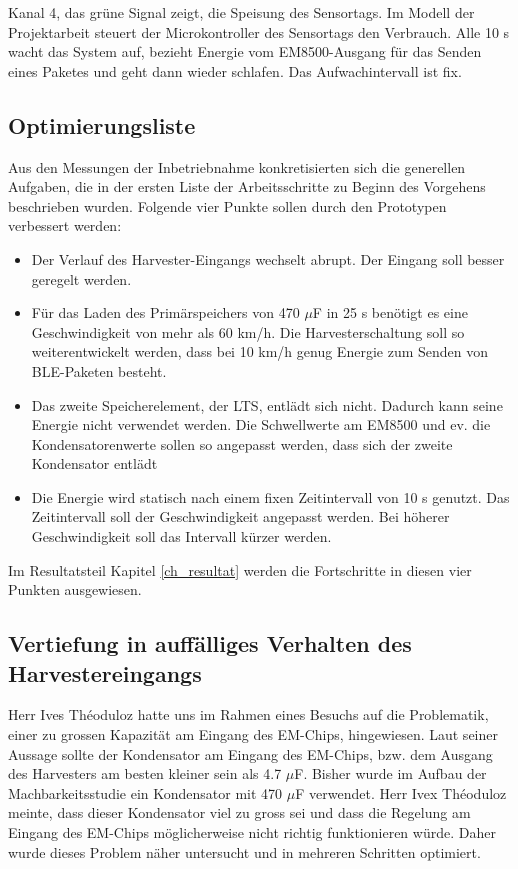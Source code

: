 Kanal 4, das grüne Signal zeigt, die Speisung des Sensortags. Im Modell der Projektarbeit steuert der Microkontroller des Sensortags den Verbrauch. Alle 10 s wacht das System auf, bezieht Energie vom EM8500-Ausgang für das Senden eines Paketes und geht dann wieder schlafen. Das Aufwachintervall ist fix.


\subsection{Optimierungsliste}\label{optimierung} 

Aus den Messungen der Inbetriebnahme konkretisierten sich die generellen Aufgaben, die in der ersten Liste der Arbeitsschritte zu Beginn des Vorgehens  beschrieben wurden. Folgende vier Punkte sollen durch den Prototypen verbessert werden: 

\begin{itemize}
     \item Der Verlauf des Harvester-Eingangs wechselt abrupt. Der Eingang soll besser geregelt werden. 
     \item Für das Laden des Primärspeichers von 470 $\mu$F in 25 s benötigt es eine Geschwindigkeit von mehr als 60 km/h.  Die Harvesterschaltung soll so weiterentwickelt werden, dass bei 10 km/h genug Energie zum Senden von BLE-Paketen besteht.    
     \item Das zweite Speicherelement, der LTS, entlädt sich nicht. Dadurch kann seine Energie nicht verwendet werden. Die Schwellwerte am EM8500 und ev. die Kondensatorenwerte sollen so angepasst werden, dass sich der zweite Kondensator entlädt
     \item Die Energie wird statisch nach einem fixen Zeitintervall von 10 s genutzt. Das Zeitintervall soll der Geschwindigkeit angepasst werden. Bei höherer Geschwindigkeit soll das Intervall kürzer werden.
\end{itemize} 


Im Resultatsteil Kapitel \ref{ch_resultat} werden die Fortschritte in diesen vier Punkten ausgewiesen.

\subsection*{Vertiefung in auffälliges Verhalten des Harvestereingangs}\label{auffaellig} 

Herr Ives Théoduloz hatte uns im Rahmen eines Besuchs auf die Problematik, einer zu grossen Kapazität am Eingang des EM-Chips, hingewiesen. Laut seiner Aussage sollte der Kondensator am Eingang des EM-Chips, bzw. dem Ausgang des Harvesters am besten kleiner sein als 4.7 $\mu$F. Bisher wurde im Aufbau der Machbarkeitsstudie ein Kondensator mit 470 $\mu$F verwendet. Herr Ivex Théoduloz meinte, dass dieser Kondensator viel zu gross sei und dass die Regelung am Eingang des EM-Chips möglicherweise nicht richtig funktionieren würde. Daher wurde dieses Problem näher untersucht und in mehreren Schritten optimiert.

